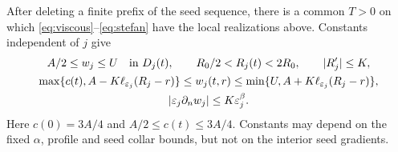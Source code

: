 \begin{lemma}\label{lem:uniform-family}
After deleting a finite prefix of the seed sequence, there is a common
$T>0$ on which \eqref{eq:viscous}--\eqref{eq:stefan} have the local
realizations above. Constants independent of $j$ give
\begin{gather}
 A/2\leq w_j\leq U\quad\hbox{in }D_j(t),\qquad
 R_0/2<R_j(t)<2R_0,\qquad |R_j'|\leq K,\label{eq:uniform-basic}\\
 \max\{c(t),A-K\ell_{\varepsilon_j}(R_j-r)\}
 \leq w_j(t,r)\leq
 \min\{U,A+K\ell_{\varepsilon_j}(R_j-r)\},\label{eq:barriers}\\
 |\varepsilon_j\partial_nw_j|\leq K\varepsilon_j^\beta.\label{eq:boundary-flux}
\end{gather}
Here $c(0)=3A/4$ and $A/2\leq c(t)\leq3A/4$.
Constants may depend on the fixed $\alpha$, profile and seed collar bounds,
but not on the interior seed gradients.
\end{lemma}

